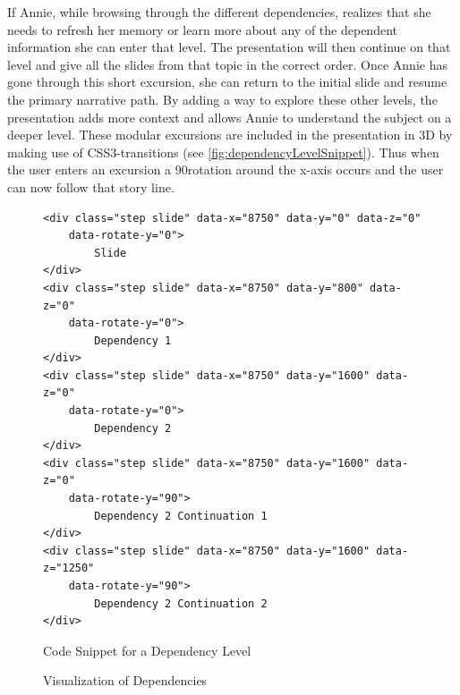 \documentclass[twoside, 12pt]{article}
\begin{document}
If Annie, while browsing through the different dependencies, realizes that she needs to refresh her memory or learn more about any of the dependent information she can enter that level. The presentation will then continue on that level and give all the slides from that topic in the correct order. Once Annie has gone through this short excursion, she can return to the initial slide and resume the primary narrative path. By adding a way to explore these other levels, the presentation adds more context and allows Annie to understand the subject on a deeper level. These modular excursions are included in the presentation in 3D by making use of CSS3-transitions (see \autoref{fig:dependencyLevelSnippet}). Thus when the user enters an excursion a 90\degree rotation around the x-axis occurs and the user can now follow that story line.\\

\begin{figure}
\vspace{-26pt}
\begin{verbatim}
<div class="step slide" data-x="8750" data-y="0" data-z="0"
	data-rotate-y="0"> 
		Slide
</div>
<div class="step slide" data-x="8750" data-y="800" data-z="0"
	data-rotate-y="0">
		Dependency 1
</div>
<div class="step slide" data-x="8750" data-y="1600" data-z="0" 
	data-rotate-y="0"> 
		Dependency 2 
</div>
<div class="step slide" data-x="8750" data-y="1600" data-z="0" 
	data-rotate-y="90">
		Dependency 2 Continuation 1
</div>
<div class="step slide" data-x="8750" data-y="1600" data-z="1250" 
	data-rotate-y="90">
		Dependency 2 Continuation 2
</div>
\end{verbatim}
\vspace{-5pt}
  \caption{Code Snippet for a Dependency Level}
  \label{fig:dependencyLevelSnippet}
  \vspace{12pt}
\end{figure}

\begin{figure}
\vspace{-26pt}
  \begin{center}
\vspace{-5pt}
  \caption{Visualization of Dependencies}
  \label{fig:visualDependency}
\vspace{-24pt}
  \end{center}
\end{figure}
\end{document}

